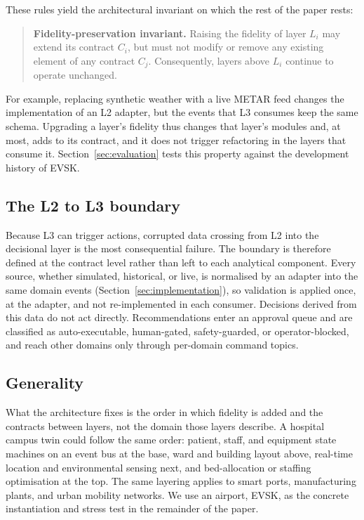 \documentclass[runningheads]{llncs}
\begin{document}
These rules yield the architectural invariant on which the rest of the paper rests:

\begin{quote}
\textbf{Fidelity-preservation invariant.} Raising the fidelity of layer $L_i$ may extend its contract $C_i$, but must not modify or remove any existing element of any contract $C_j$. Consequently, layers above $L_i$ continue to operate unchanged.
\end{quote}

For example, replacing synthetic weather with a live METAR feed changes the implementation of an L2 adapter, but the events that L3 consumes keep the same schema. Upgrading a layer's fidelity thus changes that layer's modules and, at most, adds to its contract, and it does not trigger refactoring in the layers that consume it. Section~\ref{sec:evaluation} tests this property against the development history of EVSK.

\subsection{The L2 to L3 boundary}

Because L3 can trigger actions, corrupted data crossing from L2 into the decisional layer is the most consequential failure. The boundary is therefore defined at the contract level rather than left to each analytical component. Every source, whether simulated, historical, or live, is normalised by an adapter into the same domain events (Section~\ref{sec:implementation}), so validation is applied once, at the adapter, and not re-implemented in each consumer.
Decisions derived from this data do not act directly. Recommendations enter an approval queue and are classified as auto-executable, human-gated, safety-guarded, or operator-blocked, and reach other domains only through per-domain command topics.

\subsection{Generality}

What the architecture fixes is the order in which fidelity is added and the contracts between layers, not the domain those layers describe. A hospital campus twin could follow the same order: patient, staff, and equipment state machines on an event bus at the base, ward and building layout above, real-time location and environmental sensing next, and bed-allocation or staffing optimisation at the top. The same layering applies to smart ports, manufacturing plants, and urban mobility networks. We use an airport, EVSK, as the concrete instantiation and stress test in the remainder of the paper.
\end{document}
